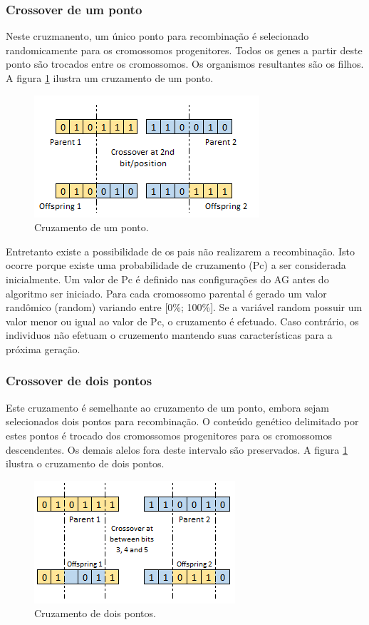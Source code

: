 \documentclass[twoside]{article}
\begin{document}
\begin{multicols}{2}
\subsubsection{Crossover de um ponto}
Neste cruzmanento, um único ponto para recombinação é selecionado randomicamente para os cromossomos progenitores. Todos os genes a partir deste ponto são trocados entre os cromossomos. Os organismos resultantes são os filhos. A figura \ref{fig:c1p} ilustra um cruzamento de um ponto.

\begin{figure}[H]
\label{fig:c1p}
  \caption{Cruzamento de um ponto.}
  \centering
    \includegraphics[scale = 0.9]{crossover_onepoint.png}
\end{figure}

Entretanto existe a possibilidade de os pais não realizarem a recombinação. Isto ocorre porque existe uma probabilidade de cruzamento (Pc) a ser considerada inicialmente. Um valor de Pc é definido nas configurações do AG antes do algoritmo ser iniciado. Para cada cromossomo parental é gerado um valor randômico (random) variando entre [0\%; 100\%]. Se a variável random possuir um valor menor ou igual ao valor de Pc, o cruzamento é efetuado. Caso contrário, os individuos não efetuam o cruzemento mantendo suas características para a próxima geração.

\subsubsection{Crossover de dois pontos}
Este cruzamento é semelhante ao cruzamento de um ponto, embora sejam selecionados dois pontos para recombinação. O conteúdo genético delimitado por estes pontos é trocado dos cromossomos progenitores para os cromossomos descendentes. Os demais alelos fora deste intervalo são preservados. A figura \ref{fig:c1p} ilustra o cruzamento de dois pontos.
\begin{figure}[H]
\label{fig:mut}
  \caption{Cruzamento de dois pontos.}
  \centering
    \includegraphics[scale = 0.9]{crossover_twopoints.png}
\end{figure}


\end{multicols}
\end{document}
